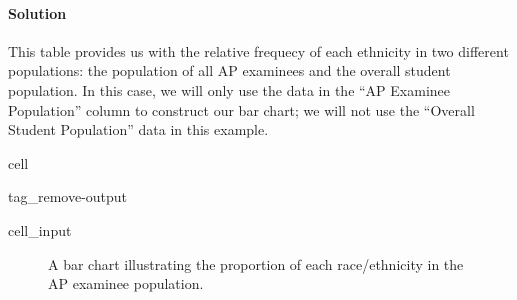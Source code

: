 \documentclass[letterpaper,10pt,english]{jupyterBook}
\begin{document}
\paragraph{Solution}
\label{\detokenize{Ch1 Sampling and Data/1.4 Tables and Charts:id3}}
\sphinxAtStartPar
This table provides us with the relative frequecy of each ethnicity in two different populations: the population of all AP examinees and the overall student population. In this case, we will only use the data in the “AP Examinee Population” column to construct our bar chart; we will not use the “Overall Student Population” data in this example.

\begin{sphinxuseclass}{cell}
\begin{sphinxuseclass}{tag_remove-output}\begin{sphinxVerbatimInput}

\begin{sphinxuseclass}{cell_input}
\begin{sphinxVerbatim}[commandchars=\\\{\}]

\end{sphinxVerbatim}

\end{sphinxuseclass}\end{sphinxVerbatimInput}

\end{sphinxuseclass}
\end{sphinxuseclass}
\begin{figure}[htbp]
\centering
\capstart

\noindent{}
\caption{A bar chart illustrating the proportion of each race/ethnicity in the AP examinee population.}\label{\detokenize{Ch1 Sampling and Data/1.4 Tables and Charts:ap-examinees-barchart}}\end{figure}
\end{document}

